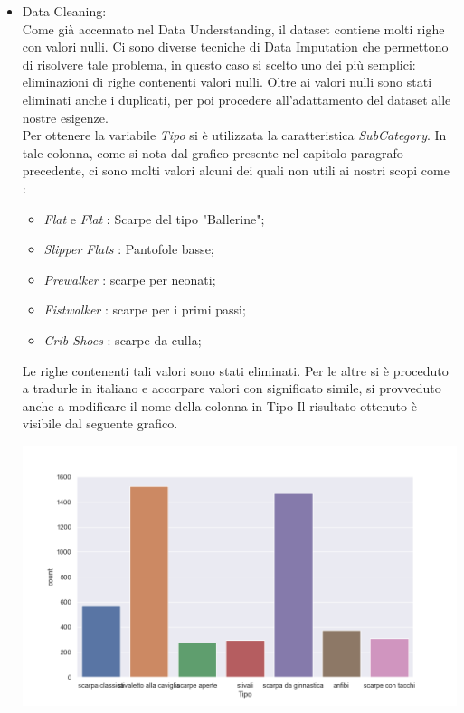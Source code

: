 \documentclass[a4paper, 11pt, oneside]{report}
\begin{document}
                \begin{itemize}
                    \item Data Cleaning:\\
                    Come già accennato nel Data Understanding, il dataset contiene molti righe con valori nulli.
                    Ci sono diverse tecniche di Data Imputation che permettono di risolvere tale problema,
                    in questo caso si scelto uno dei più semplici: eliminazioni di righe contenenti valori nulli.
                    Oltre ai valori nulli sono stati eliminati anche i duplicati, per poi procedere all'adattamento
                    del dataset alle nostre esigenze.\\
                    Per ottenere la variabile \emph{Tipo} si è utilizzata la caratteristica \emph{SubCategory}.
                    In tale colonna, come si nota dal grafico presente nel capitolo paragrafo precedente, ci sono molti valori
                    alcuni dei quali non utili ai nostri scopi come :
                    \begin{itemize}
                        \item \emph{Flat} e \emph{Flat} : Scarpe del tipo "Ballerine";
                        \item \emph{Slipper Flats} : Pantofole basse;
                        \item \emph{Prewalker} : scarpe per neonati;
                        \item \emph{Fistwalker} : scarpe per i primi passi;
                        \item \emph{Crib Shoes} : scarpe da culla;
                    \end{itemize}
                    Le righe contenenti tali valori sono stati eliminati.
                    Per le altre si è proceduto a tradurle in italiano e accorpare valori con significato simile,
                    si provveduto anche a modificare il nome della colonna in Tipo
                    Il risultato ottenuto è visibile dal seguente grafico.
                    \begin{center}
                        \includegraphics[scale=0.4]{countTipoShoes}

\end{center}
\end{itemize}
\end{document}
